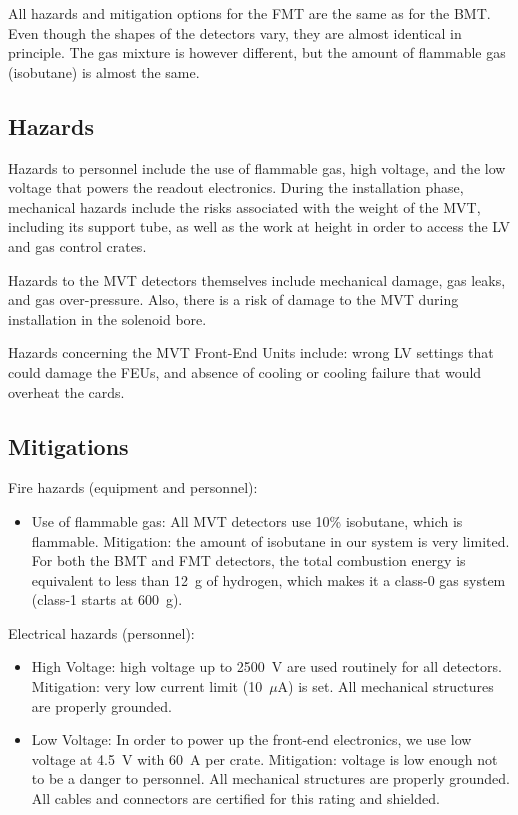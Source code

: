 All hazards and mitigation options for the FMT are the same as for the BMT. Even though the 
shapes of the detectors vary, they are almost identical in principle. The gas mixture is 
however different, but the amount of flammable gas (isobutane) is almost the same.

\subsection{Hazards} 

Hazards to personnel include the use of flammable gas, high voltage, and the low voltage that 
powers the readout electronics. During the installation phase, mechanical hazards include the 
risks associated with the weight of the MVT, including its support tube, as well as the work at 
height in order to access the LV and gas control crates.

Hazards to the MVT detectors themselves include mechanical damage, gas leaks, and gas 
over-pressure. Also, there is a risk of damage to the MVT during installation in the solenoid 
bore.

Hazards concerning the MVT Front-End Units include: wrong LV settings that could damage the FEUs, 
and absence of cooling or cooling failure that would overheat the cards.

\subsection{Mitigations}

Fire hazards (equipment and personnel):
\begin{itemize}
\item Use of flammable gas: All MVT detectors use 10\% isobutane, which is flammable. Mitigation: 
the amount of isobutane in our system is very limited. For both the BMT and FMT detectors, the 
total combustion energy is equivalent to less than 12~g of hydrogen, which makes it a class-0 
gas system (class-1 starts at 600~g).
\end{itemize}

Electrical hazards (personnel):
\begin{itemize}
\item High Voltage: high voltage up to 2500~V are used routinely for all detectors. Mitigation: 
very low current limit (10~$\mu$A) is set. All mechanical structures are properly grounded.
\item Low Voltage: In order to power up the front-end electronics, we use low voltage at 4.5~V 
with 60~A per crate. Mitigation: voltage is low enough not to be a danger to personnel. All 
mechanical structures are properly grounded. All cables and connectors are certified for this 
rating and shielded.
\end{itemize}

